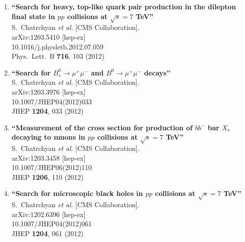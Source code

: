 \documentclass{article}
\begin{document}
\begin{enumerate}
\item%
{\bf ``Search for heavy, top-like quark pair production in the dilepton final state in $pp$ collisions at $\sqrt{s} = 7$ TeV''}
  \\{}S.~Chatrchyan {\it et al.}  [CMS Collaboration].
  \\{}arXiv:1203.5410 [hep-ex]
    \\{}10.1016/j.physletb.2012.07.059
\\{}Phys.\ Lett.\ B {\bf 716}, 103 (2012) %


\item%
{\bf ``Search for $B^0_s \to \mu^+ \mu^-$ and $B^0 \to \mu^+ \mu^-$ decays''}
  \\{}S.~Chatrchyan {\it et al.}  [CMS Collaboration].
  \\{}arXiv:1203.3976 [hep-ex]
    \\{}10.1007/JHEP04(2012)033
\\{}JHEP {\bf 1204}, 033 (2012) %


\item%
{\bf ``Measurement of the cross section for production of $b b^-$ bar $X$, decaying to muons in $pp$ collisions at $\sqrt{s}=7$ TeV''}
  \\{}S.~Chatrchyan {\it et al.}  [CMS Collaboration].
  \\{}arXiv:1203.3458 [hep-ex]
    \\{}10.1007/JHEP06(2012)110
\\{}JHEP {\bf 1206}, 110 (2012) %


\item%
{\bf ``Search for microscopic black holes in $pp$ collisions at $\sqrt{s}=7$ TeV''}
  \\{}S.~Chatrchyan {\it et al.}  [CMS Collaboration].
  \\{}arXiv:1202.6396 [hep-ex]
    \\{}10.1007/JHEP04(2012)061
\\{}JHEP {\bf 1204}, 061 (2012) %



\end{enumerate}
\end{document}
